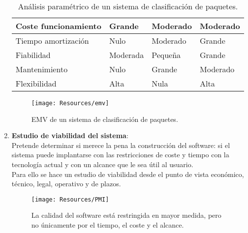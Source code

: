 \begin{enumerate}
\begin{table}[h]
{\begin{tabular}{l|l|l|l|}
                      \multicolumn{1}{|l|}{Coste funcionamiento} & Grande                                      & Moderado                                    & Moderado                                    \\ \hline
                      \multicolumn{1}{|l|}{Tiempo amortización}  & Nulo                                        & Moderado                                    & Grande                                      \\ \hline
                      \multicolumn{1}{|l|}{Fiabilidad}           & Moderada                                    & Pequeña                                     & Grande                                      \\ \hline
                      \multicolumn{1}{|l|}{Mantenimiento}        & Nulo                                        & Grande                                      & Moderado                                    \\ \hline
                      \multicolumn{1}{|l|}{Flexibilidad}         & Alta                                        & Nula                                        & Alta                                        \\ \hline
                  \end{tabular}%
              }
              \caption{Análisis paramétrico de un sistema de clasificación de paquetes.}
              \label{tab:analisisParametrico}
          \end{table}

          \begin{figure}[H]
              \centering
              \texttt{[image: Resources/emv]}
              \caption{EMV de un sistema de clasificación de paquetes.}
              \label{fig:emv}
          \end{figure}


    \item \textbf{Estudio de viabilidad del sistema}:\\
          Pretende determinar si merece la pena la construcción del software: si el sistema puede implantarse con las restricciones de coste y tiempo con la tecnología actual y con un alcance que le sea útil al usuario.\\
          Para ello se hace un estudio de viabilidad desde el punto de vista económico, técnico, legal, operativo y de plazos.
          \begin{figure}[H]
              \centering
              \texttt{[image: Resources/PMI]}
              \caption{La calidad del software está restringida en mayor medida, pero no únicamente por el tiempo, el coste y el alcance.}
              \label{fig:PMI}
          \end{figure}


\end{enumerate}
